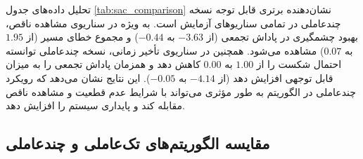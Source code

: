 تحلیل داده‌های جدول \ref{tab:sac_comparison} نشان‌دهنده برتری قابل توجه نسخه چندعاملی  در تمامی سناریوهای آزمایش است. به ویژه در سناریوی مشاهده ناقص، بهبود چشمگیری در پاداش تجمعی (از $-3.63$ به $-0.44$) و مجموع خطای مسیر (از $1.95$ به $0.07$) مشاهده می‌شود. همچنین در سناریوی تأخیر زمانی، نسخه چندعاملی توانسته احتمال شکست را از $1.00$ به $0.00$ کاهش دهد و همزمان پاداش تجمعی را به میزان قابل توجهی افزایش دهد (از $-4.14$ به $-0.05$). این نتایج نشان می‌دهد که رویکرد چندعاملی در الگوریتم  به طور مؤثری می‌تواند با شرایط عدم قطعیت و مشاهده ناقص مقابله کند و پایداری سیستم را افزایش دهد.

\subsection{مقایسه الگوریتم‌های تک‌عاملی و چندعاملی }


